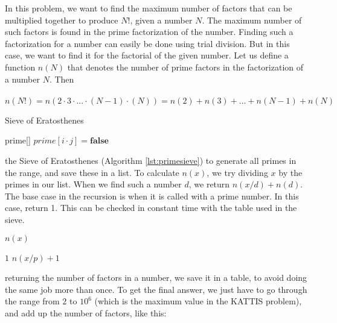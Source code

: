 \documentclass[11pt,a4paper,twoside]{article}
\begin{document}
In this problem, we want to find the maximum number of factors that can be
multiplied together to produce $N!$, given a number $N$.  The maximum number of
such factors is found in the prime factorization of the number. Finding such a
factorization for a number can easily be done using trial division. But in this
case, we want to find it for the factorial of the given number.  Let us define
a function $n(N)$ that denotes the number of prime factors in the factorization
of a number $N$. Then
\\\\
$n(N!) = n(2 \cdot 3 \cdot ... \cdot (N-1) \cdot (N)) = n(2) + n(3) + ... + n(N-1) + n(N)$
\\
\begin{algorithm}
    \caption{Sieve of Eratosthenes}
    \label{lst:primesieve}
    \begin{algorithmic}
        \STATE prime[] 
                \STATE $prime[i \cdot j] = \textbf{false}$
            \ENDFOR
        \ENDFOR
    \end{algorithmic}
\end{algorithm}
            
 the Sieve of Eratosthenes (Algorithm \ref{lst:primesieve}) to
generate all primes in the range, and save these in a list. To calculate
$n(x)$, we try dividing $x$ by the primes in our list. When we find such a
number $d$, we return $n(x/d) + n(d)$. The base case in the recursion is when
it is called with a prime number. In this case, return 1.  This can be checked
in constant time with the table used in the sieve.


\begin{algorithm}
    \caption{$n(x)$}
    \label{lst:nx}
    \begin{algorithmic}
            \RETURN $1$
        \ENDIF
                \RETURN $n(x/p) + 1$
            \ENDIF
        \ENDFOR
    \end{algorithmic}
\end{algorithm}
    
 returning the number of factors in a number, we save it in a
table, to avoid doing the same job more than once. To get the final answer, we
just have to go through the range from $2$ to $10^6$ (which is the maximum
value in the KATTIS problem), and add up the number of factors, like this:
\end{document}
